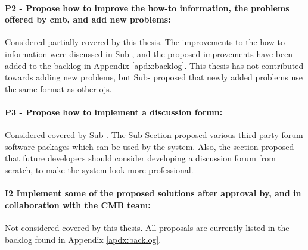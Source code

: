 \paragraph*{P2 - Propose how to improve the how-to information, the problems offered by \gls{cmb}, and add new problems:} Considered partially covered by this thesis. The improvements to the how-to information were discussed in Sub-, and the proposed improvements have been added to the backlog in Appendix \ref{apdx:backlog}. This thesis has not contributed towards adding new problems, but Sub- proposed that newly added problems use the same format as other \glspl{oj}.

\paragraph*{P3 - Propose how to implement a discussion forum:} Considered covered by Sub-. The Sub-Section proposed various third-party forum software packages which can be used by the system. Also, the section proposed that future developers should consider developing a discussion forum from scratch, to make the system look more professional.

\paragraph*{I2 Implement some of the proposed solutions after approval by, and in collaboration with the CMB team:} Not considered covered by this thesis. All proposals are currently listed in the backlog found in Appendix \ref{apdx:backlog}.
